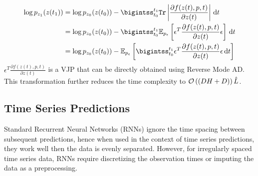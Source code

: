 %
\begin{align}
  \log{p_{z_1}(z(t_1))} & = \log{p_{z_0}(z(t_0))} - \bigintss_{t_0}^{t_1} \texttt{Tr}\left| \frac{\partial f(z(t), p, t)}{\partial z(t)} \right| \, \dt                                  \\
                        & = \log{p_{z_0}(z(t_0))} - \bigintss_{t_0}^{t_1} \mathbb{E}_{p_\epsilon} \left[ \epsilon^T \frac{\partial f(z(t), p, t)}{\partial z(t)} \epsilon \right] \, \dt \\
                        & = \log{p_{z_0}(z(t_0))} - \mathbb{E}_{p_\epsilon} \left[ \bigintss_{t_0}^{t_1} \epsilon^T \frac{\partial f(z(t), p, t)}{\partial z(t)} \epsilon \, \dt \right]
\end{align}
%
$\epsilon^T \frac{\partial f(z(t), p, t)}{\partial z(t)}$ is a VJP that can be directly obtained using Reverse Mode AD. This transformation further reduces the time complexity to $\mathcal{O}\left((DH + D)\right)\hat{L}$.

\subsection{Time Series Predictions}
\label{subsec:time_series_predictions}

Standard Recurrent Neural Networks (RNNs) ignore the time spacing between subsequent predictions, hence when used in the context of time series predictions, they work well then the data is evenly separated. However, for irregularly spaced time series data, RNNs require discretizing the observation times or imputing the data as a preprocessing.

